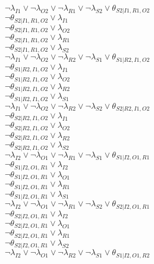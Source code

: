 $\neg\lambda_{I1} \vee \neg\lambda_{O2} \vee \neg\lambda_{R1} \vee \neg\lambda_{S2} \vee \theta_{S2|I1,R1,O2}$\\
$\neg\theta_{S2|I1,R1,O2} \vee \lambda_{I1}$\\
$\neg\theta_{S2|I1,R1,O2} \vee \lambda_{O2}$\\
$\neg\theta_{S2|I1,R1,O2} \vee \lambda_{R1}$\\
$\neg\theta_{S2|I1,R1,O2} \vee \lambda_{S2}$\\
$\neg\lambda_{I1} \vee \neg\lambda_{O2} \vee \neg\lambda_{R2} \vee \neg\lambda_{S1} \vee \theta_{S1|R2,I1,O2}$\\
$\neg\theta_{S1|R2,I1,O2} \vee \lambda_{I1}$\\
$\neg\theta_{S1|R2,I1,O2} \vee \lambda_{O2}$\\
$\neg\theta_{S1|R2,I1,O2} \vee \lambda_{R2}$\\
$\neg\theta_{S1|R2,I1,O2} \vee \lambda_{S1}$\\
$\neg\lambda_{I1} \vee \neg\lambda_{O2} \vee \neg\lambda_{R2} \vee \neg\lambda_{S2} \vee \theta_{S2|R2,I1,O2}$\\
$\neg\theta_{S2|R2,I1,O2} \vee \lambda_{I1}$\\
$\neg\theta_{S2|R2,I1,O2} \vee \lambda_{O2}$\\
$\neg\theta_{S2|R2,I1,O2} \vee \lambda_{R2}$\\
$\neg\theta_{S2|R2,I1,O2} \vee \lambda_{S2}$\\
$\neg\lambda_{I2} \vee \neg\lambda_{O1} \vee \neg\lambda_{R1} \vee \neg\lambda_{S1} \vee \theta_{S1|I2,O1,R1}$\\
$\neg\theta_{S1|I2,O1,R1} \vee \lambda_{I2}$\\
$\neg\theta_{S1|I2,O1,R1} \vee \lambda_{O1}$\\
$\neg\theta_{S1|I2,O1,R1} \vee \lambda_{R1}$\\
$\neg\theta_{S1|I2,O1,R1} \vee \lambda_{S1}$\\
$\neg\lambda_{I2} \vee \neg\lambda_{O1} \vee \neg\lambda_{R1} \vee \neg\lambda_{S2} \vee \theta_{S2|I2,O1,R1}$\\
$\neg\theta_{S2|I2,O1,R1} \vee \lambda_{I2}$\\
$\neg\theta_{S2|I2,O1,R1} \vee \lambda_{O1}$\\
$\neg\theta_{S2|I2,O1,R1} \vee \lambda_{R1}$\\
$\neg\theta_{S2|I2,O1,R1} \vee \lambda_{S2}$\\
$\neg\lambda_{I2} \vee \neg\lambda_{O1} \vee \neg\lambda_{R2} \vee \neg\lambda_{S1} \vee \theta_{S1|I2,O1,R2}$\\
